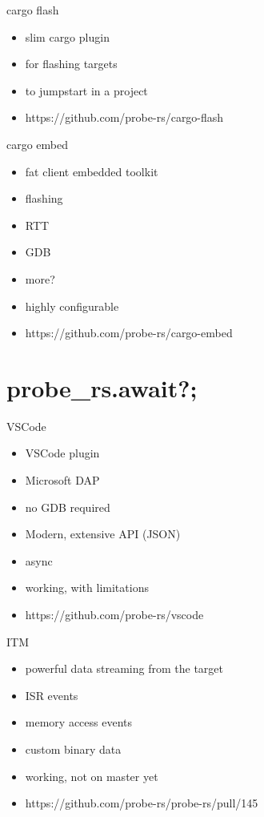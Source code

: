 \documentclass[aspectratio=1610,14pt,t]{beamer}
\begin{document}
\begin{frame}[c,fragile]{cargo flash}
  \begin{itemize}
    \item slim cargo plugin
    \item for flashing targets
    \item to jumpstart in a project
    \item https://github.com/probe-rs/cargo-flash
  \end{itemize}
\end{frame}

\begin{frame}[c,fragile]{cargo embed}
  \begin{itemize}
    \item fat client embedded toolkit
    \item flashing
    \item RTT
    \item GDB
    \item more?
    \item highly configurable
    \item https://github.com/probe-rs/cargo-embed
  \end{itemize}
\end{frame}

\section{probe\_rs.await?;}

\begin{frame}[c,fragile]{VSCode}
  \begin{itemize}
    \item VSCode plugin
    \item Microsoft DAP
    \item no GDB required
    \item Modern, extensive API (JSON)
    \item async
    \item working, with limitations
    \item https://github.com/probe-rs/vscode
  \end{itemize}
\end{frame}

\begin{frame}[c,fragile]{ITM}
  \begin{itemize}
    \item powerful data streaming from the target
    \item ISR events
    \item memory access events
    \item custom binary data
    \item working, not on master yet
    \item https://github.com/probe-rs/probe-rs/pull/145
  \end{itemize}
\end{frame}
\end{document}
